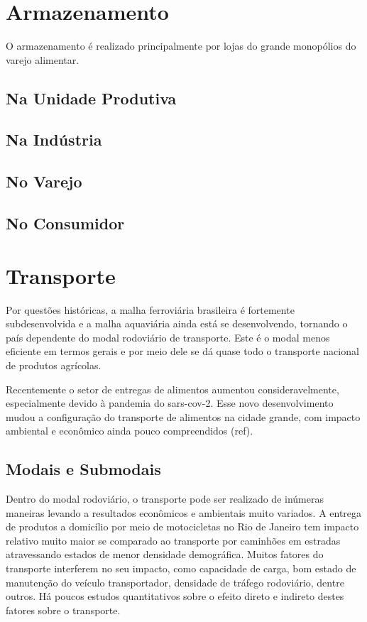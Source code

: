 \documentclass[]{article}
\begin{document}
	\section{Armazenamento}
		O armazenamento é realizado principalmente por lojas do grande monopólios do varejo alimentar.
		
	\subsection{Na Unidade Produtiva}
	
	\subsection{Na Indústria}
	\subsection{No Varejo}
	\subsection{No Consumidor}
		
	\section{Transporte}
		Por questões históricas, a malha ferroviária brasileira é fortemente subdesenvolvida e a malha aquaviária ainda está se desenvolvendo, tornando o país dependente do modal rodoviário de transporte. Este é o modal menos eficiente em termos gerais e por meio dele se dá quase todo o transporte nacional de produtos agrícolas. 

Recentemente o setor de entregas de alimentos aumentou consideravelmente, especialmente devido à pandemia do sars-cov-2. Esse novo desenvolvimento mudou a configuração do transporte de alimentos na cidade grande, com impacto ambiental e econômico ainda pouco compreendidos (ref). 

	\subsection{Modais e Submodais}

		Dentro do modal rodoviário, o transporte pode ser realizado de inúmeras maneiras levando a resultados econômicos e ambientais muito variados. A entrega de produtos a domicílio por meio de motocicletas no Rio de Janeiro tem impacto relativo muito maior se comparado ao transporte por caminhões em estradas atravessando estados de menor densidade demográfica. Muitos fatores do transporte interferem no seu impacto, como capacidade de carga, bom estado de manutenção do veículo transportador, densidade de tráfego rodoviário, dentre outros. Há poucos estudos quantitativos sobre o efeito direto e indireto destes fatores sobre o transporte.
		
\end{document}
